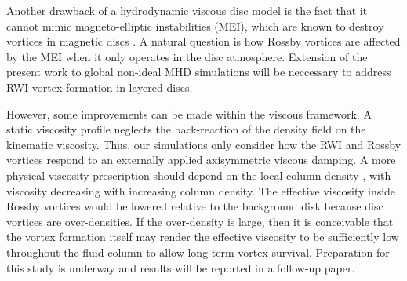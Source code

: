 Another drawback of a hydrodynamic viscous disc model is the
fact that it cannot mimic magneto-elliptic instabilities (MEI), which
are known to destroy vortices in magnetic discs
\citep{lyra11,mizerski12}. A natural question is how 
Rossby vortices are affected by the MEI when it only operates in
the disc atmosphere. Extension of the present work to global non-ideal
MHD simulations will be neccessary to address RWI vortex formation in
layered discs.   

However, some improvements can be made within the viscous
framework. A static viscosity profile neglects the
back-reaction of the density field on the kinematic viscosity. Thus,
our simulations only consider how the RWI and Rossby vortices
respond to an externally applied axisymmetric viscous damping. A more
physical viscosity prescription should depend on the local column density
\citep{fleming03}, with viscosity decreasing with increasing column
density. The effective viscosity inside Rossby vortices would be
lowered relative to the background disk because disc vortices are
over-densities. If the over-density is large, then it is
conceivable that the vortex formation itself may render the effective
viscosity to be sufficiently low throughout the fluid column to allow
long term vortex survival.    
Preparation for this study is underway and results will be reported in
a follow-up paper. 

